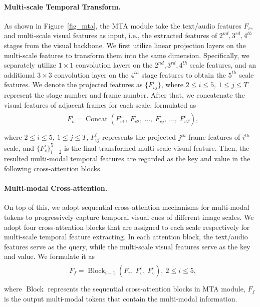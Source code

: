\documentclass{article}
\begin{document}
\paragraph{Multi-scale Temporal Transform.}
As shown in Figure~\ref{fig_mta}, the MTA module take the text/audio features $F_r$, and multi-scale visual features as input, i.e., the extracted features of $2^{nd}, 3^{rd}, 4^{th}$ stages from the visual backbone. We first utilize linear projection layers on the multi-scale features to transform them into the same dimension. Specifically, we separately utilize $1\times1$ convolution layers on the $2^{nd},3^{rd},4^{th}$ scale features, and an additional $3\times3$ convolution layer on the $4^{th}$ stage features to obtain the $5^{th}$ scale features. We denote the projected features as $\{F_{vj}^i\}$, where $2\le i \le 5,\ 1 \le j\le T$ represent the stage number and frame number. After that, we concatenate the visual features of adjacent frames for each scale, formulated as
\begin{align}
\label{mta_concat}
\begin{split}
    & F_{v}^i = \operatorname{Concat}(F_{v1}^i,\ F_{v2}^i,\ ...,\ F_{vj}^i,\ ...,\ F_{vT}^i), \\
\end{split}
\end{align} 
where $2\le i \le 5,\ 1 \le j\le T$, $F_{vj}^i$ represents the projected $j^{th}$ frame features of $i^{th}$ scale, and $\{F_{v}^i\}_{i=2}^{5}$ is the final transformed multi-scale visual feature. 
Then, the resulted multi-modal temporal features are regarded as the key and value in the following cross-attention blocks.

\paragraph{Multi-modal Cross-attention.}
On top of this, we adopt sequential cross-attention mechanisms for multi-modal tokens to progressively capture temporal visual cues of different image scales. 
We adopt four cross-attention blocks that are assigned to each scale respectively for multi-scale temporal feature extracting.
In each attention block, the text/audio features serve as the query, while the multi-scale visual features serve as the key and value. We formulate it as
\begin{align}
\label{mta_eq}
\begin{split}
    & F_f = \operatorname{Block}_{i-1}(F_r,\ F_{v}^i,\ F_{v}^i),\ 2 \le i \le 5, \\
\end{split}
\end{align}
where $\operatorname{Block}$ represents the sequential cross-attention blocks in MTA module, $F_f$ is the output multi-modal tokens that contain the multi-modal information. 
\end{document}
